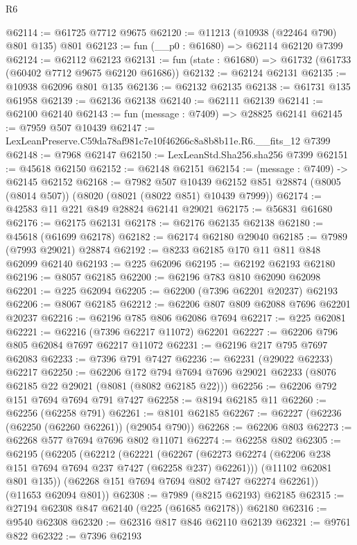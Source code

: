 \begin{lexlean}{R6}
\begin{coremodule}
@62114 := @61725 @7712 @9675
@62120 := @11213 (@10938 (@22464 @790) @801 @135) @801
@62123 := fun (__p0 : @61680) => @62114 @62120 @7399
@62124 := @62112 @62123
@62131 := fun (state : @61680) => @61732 (@61733 (@60402 @7712 @9675 @62120 @61686))
@62132 := @62124 @62131
@62135 := @10938 @62096 @801 @135
@62136 := @62132 @62135
@62138 := @61731 @135 @61958
@62139 := @62136 @62138
@62140 := @62111 @62139
@62141 := @62100 @62140
@62143 := fun (message : @7409) => @28825 @62141
@62145 := @7959 @507 @10439
@62147 := LexLeanPreserve.C59da78af981c7e10f46266c8a8b8b11e.R6.__fits_12 @7399
@62148 := @7968 @62147
@62150 := LexLeanStd.Sha256.sha256 @7399
@62151 := @45618 @62150
@62152 := @62148 @62151
@62154 := (message : @7409) -> @62145 @62152
@62168 := @7982
    @507
    @10439
    @62152
    @851
    @28874
    (@8005 (@8014 @507))
    (@8020 (@8021 (@8022 @851) @10439 @7999))
@62174 := @42583 @11 @221 @849 @28824 @62141 @29021
@62175 := @56831 @61680
@62176 := @62175 @62131
@62178 := @62176 @62135 @62138
@62180 := @45618 (@61699 @62178)
@62182 := @62174 @62180 @29040
@62185 := @7989 (@7993 @29021) @28874
@62192 := @8233 @62185 @170 @11 @811 @848 @62099 @62140
@62193 := @225 @62096
@62195 := @62192 @62193 @62180
@62196 := @8057 @62185
@62200 := @62196 @783 @810 @62090 @62098
@62201 := @225 @62094
@62205 := @62200 (@7396 @62201 @20237) @62193
@62206 := @8067 @62185
@62212 := @62206 @807 @809 @62088 @7696 @62201 @20237
@62216 := @62196 @785 @806 @62086 @7694
@62217 := @225 @62081
@62221 := @62216 (@7396 @62217 @11072) @62201
@62227 := @62206 @796 @805 @62084 @7697 @62217 @11072
@62231 := @62196 @217 @795 @7697 @62083
@62233 := @7396 @791 @7427
@62236 := @62231 (@29022 @62233) @62217
@62250 := @62206
    @172
    @794
    @7694
    @7696
    @29021
    @62233
    (@8076 @62185 @22 @29021 (@8081 (@8082 @62185 @22)))
@62256 := @62206 @792 @151 @7694 @7694 @791 @7427
@62258 := @8194 @62185 @11
@62260 := @62256 (@62258 @791)
@62261 := @8101 @62185
@62267 := @62227 (@62236 (@62250 (@62260 @62261)) (@29054 @790))
@62268 := @62206 @803
@62273 := @62268 @577 @7694 @7696 @802 @11071
@62274 := @62258 @802
@62305 := @62195
    (@62205
      (@62212
        (@62221
          (@62267 (@62273 @62274 (@62206 @238 @151 @7694 @7694 @237 @7427 (@62258 @237) @62261)))
          (@11102 @62081 @801 @135))
        (@62268 @151 @7694 @7694 @802 @7427 @62274 @62261))
      (@11653 @62094 @801))
@62308 := @7989 (@8215 @62193) @62185
@62315 := @27194 @62308 @847 @62140 (@225 (@61685 @62178)) @62180
@62316 := @9540 @62308
@62320 := @62316 @817 @846 @62110 @62139
@62321 := @9761 @822
@62322 := @7396 @62193

\end{coremodule}
\end{lexlean}
